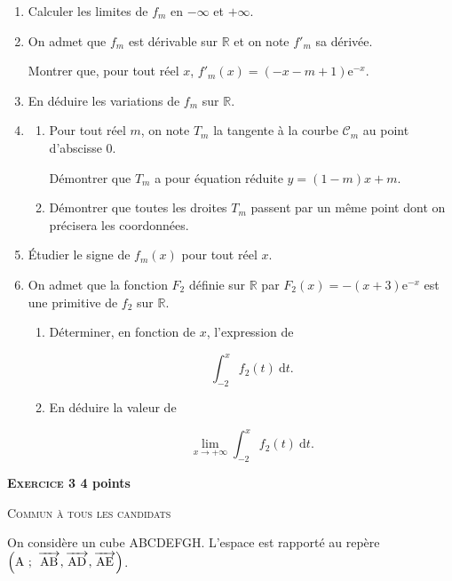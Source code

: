 \documentclass[10pt,a4paper]{article}
\newcommand{\R}{\mathbb{R}}
\newcommand{\vect}[1]{\overrightarrow{\,\mathstrut#1\,}}
\begin{document}
\begin{enumerate}
\item Calculer les limites de $f_m$ en $- \infty$ et $+ \infty$.
\item On admet que $f_m$ est dérivable sur $\R$ et on note $f'_m$ sa dérivée.

Montrer que, pour tout réel $x$,\: $f'_m(x) = (-x - m + 1)\text{e}^{- x}$.
\item En déduire les variations de $f_m$ sur $\R$.
\item 
	\begin{enumerate}
		\item Pour tout réel $m$, on note $T_m$ la tangente à la courbe $\mathcal{C}_m$ au point d'abscisse $0$.
		
Démontrer que $T_m$ a pour équation réduite $y = (1 - m)x + m$.
		\item Démontrer que toutes les droites $T_m$ passent par un même point dont on précisera
les coordonnées.
	\end{enumerate}
\item Étudier le signe de $f_m(x)$ pour tout réel $x$.
\item On admet que la fonction $F_2$ définie sur $\R$ par $F_2(x) = -(x + 3)\text{e}^{- x}$ est une
primitive de $f_2$ sur $\R$.
	\begin{enumerate}
		\item Déterminer, en fonction de $x$, l'expression de
		
\[\displaystyle\int_{-2}^x f_2(t)\:\text{d}t.\]
		\item En déduire la valeur de
		
\[\displaystyle\lim_{x \to + \infty} \int_{-2}^x f_2(t)\:\text{d}t.\]
	\end{enumerate}
\end{enumerate}

\vspace{1cm}

\textbf{\textsc{Exercice 3} \hfill 4 points}

\textsc{Commun à tous les candidats}

\bigskip

On considère un cube ABCDEFGH. L'espace est rapporté au repère $\left(\text{A}~;~\vect{\text{AB}}, \vect{\text{AD}}, \vect{\text{AE}}\right)$.
\end{document}
